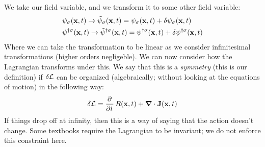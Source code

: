 We take our field variable, and we transform it to some other field variable:
\begin{equation}
    \begin{split}
        &\psi_\sigma(\mathbf{x}, t) \to \tilde{\psi}_\sigma(\mathbf{x}, t) = \psi_\sigma(\mathbf{x}, t) + \delta\psi_\sigma(\mathbf{x}, t)
        \\ &\psi^{\dagger\sigma}(\mathbf{x}, t) \to \tilde{\psi}^{\dagger\sigma}(\mathbf{x}, t) = \psi^{\dagger\sigma}(\mathbf{x}, t) + \delta\psi^{\dagger\sigma}(\mathbf{x}, t)
    \end{split}
\end{equation}
Where we can take the transformation to be linear as we consider infinitesimal transformations (higher orders negligeble). We can now consider how the Lagrangian transforms under this. We say that this is a \emph{symmetry} (this is our definition) if $\delta \mathcal{L}$ can be organized (algebraically; without looking at the equations of motion) in the following way:
\begin{equation}
    \delta \L = \dpd{}{t}R(\v{x}, t) + \nabla \cdot \v{J}(\v{x}, t)
\end{equation}
If things drop off at infinity, then this is a way of saying that the action doesn't change. Some textbooks require the Lagrangian to be invariant; we do not enforce this constraint here.

